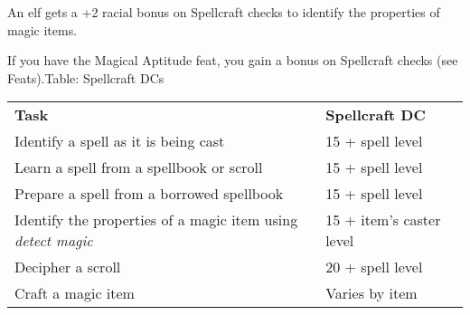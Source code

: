 An elf gets a +2 racial bonus on Spellcraft checks to identify the properties of magic items.
				
If you have the Magical Aptitude feat, you gain a bonus on Spellcraft checks (see Feats).Table: Spellcraft DCs
\begin{table}
\sffamily
 \begin{tabular}{ll}
\textbf{Task} & \textbf{Spellcraft DC}\\
Identify a spell as it is being cast & 15 + spell level\\
Learn a spell from a spellbook or scroll & 15 + spell level\\
Prepare a spell from a borrowed spellbook & 15 + spell level\\
Identify the properties of a magic item using \textit{detect magic} & 15 + item's caster level\\
Decipher a scroll & 20 + spell level\\
Craft a magic item & Varies by item\\
 \end{tabular}

\end{table}


        	
